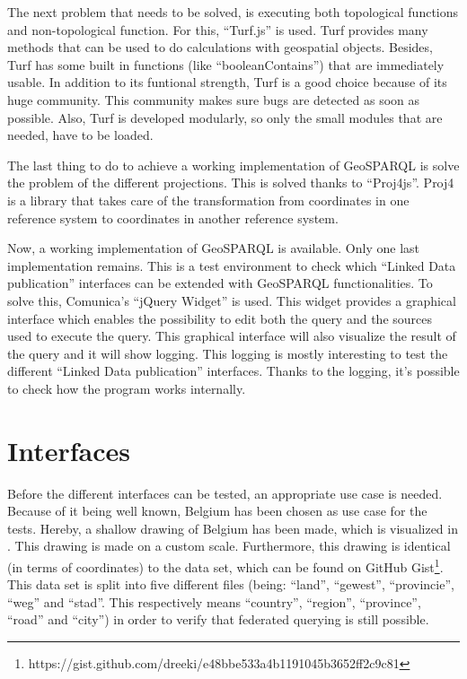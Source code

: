 \documentclass[twocolumn]{phdsymp} %
\begin{document}
The next problem that needs to be solved, is executing both topological functions and non-topological function. For this, ``Turf.js'' is used. Turf provides many methods that can be used to do calculations with geospatial objects. Besides, Turf has some built in functions (like ``booleanContains'') that are immediately usable. In addition to its funtional strength, Turf is a good choice because of its huge community. This community makes sure bugs are detected as soon as possible. Also, Turf is developed modularly, so only the small modules that are needed, have to be loaded.

The last thing to do to achieve a working implementation of GeoSPARQL is solve the problem of the different projections. This is solved thanks to ``Proj4js''. Proj4 is a library that takes care of the transformation from coordinates in one reference system to coordinates in another reference system.

Now, a working implementation of GeoSPARQL is available. Only one last implementation remains. This is a test environment to check which ``Linked Data publication'' interfaces can be extended with GeoSPARQL functionalities. To solve this, Comunica's ``jQuery Widget'' is used. This widget provides a graphical interface which enables the possibility to edit both the query and the sources used to execute the query. This graphical interface will also visualize the result of the query and it will show logging. This logging is mostly interesting to test the different ``Linked Data publication'' interfaces. Thanks to the logging, it's possible to check how the program works internally. 
 
\section{Interfaces}
Before the different interfaces can be tested, an appropriate use case is needed. Because of it being well known, Belgium has been chosen as use case for the tests. Hereby, a shallow drawing of Belgium has been made, which is visualized in . This drawing is made on a custom scale. Furthermore, this drawing is identical (in terms of coordinates) to the data set, which can be found on GitHub Gist\footnote{https://gist.github.com/dreeki/e48bbe533a4b1191045b3652ff2c9c81}. This data set is split into five different files (being: ``land'', ``gewest'', ``provincie'', ``weg'' and ``stad''. This respectively means ``country'', ``region'', ``province'', ``road'' and ``city'') in order to verify that federated querying is still possible.
\end{document}
